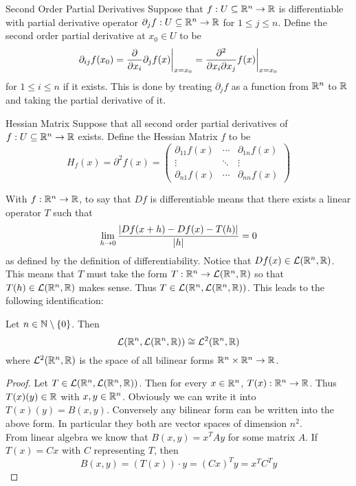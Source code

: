 \documentclass[a4paper]{article}
\begin{document}
\begin{defn}{Second Order Partial Derivatives}{} Suppose that $f:U\subseteq\mathbb{R}^n\to\mathbb{R}$ is differentiable with partial derivative operator $\partial_jf:U\subseteq\mathbb{R}^n\to\mathbb{R}$ for $1\leq j\leq n$. Define the second order partial derivative at $x_0\in U$ to be $$\partial_{ij}f(x_0)=\frac{\partial}{\partial x_i}\partial_jf(x)\bigg{|}_{x=x_0}=\frac{\partial^2}{\partial x_i\partial x_j}f(x)\bigg{|}_{x=x_0}$$
for $1\leq i\leq n$ if it exists. This is done by treating $\partial_jf$ as a function from $\mathbb{R}^n$ to $\mathbb{R}$ and taking the partial derivative of it. 
\end{defn}

\begin{defn}{Hessian Matrix}{} Suppose that all second order partial derivatives of $f:U\subseteq\mathbb{R}^n\to\mathbb{R}$ exists. Define the Hessian Matrix $f$ to be $$H_f(x)=\partial^2 f(x)=\begin{pmatrix}
\partial_{11}f(x) & \cdots & \partial_{1n}f(x)\\
\vdots & \ddots & \vdots\\
\partial_{n1}f(x) & \cdots & \partial_{nn}f(x)
\end{pmatrix}$$
\end{defn}

With $f:\mathbb{R}^n\to\mathbb{R}$, to say that $Df$ is differentiable means that there exists a linear operator $T$ such that $$\lim_{h\to 0}\frac{\abs{Df(x+h)-Df(x)-T(h)}}{\abs{h}}=0$$ as defined by the definition of differentiability. Notice that $Df(x)\in\mathcal{L}(\mathbb{R}^n,\mathbb{R})$. This means that $T$ must take the form $T:\mathbb{R}^n\to\mathcal{L}(\mathbb{R}^n,\mathbb{R})$ so that $T(h)\in\mathcal{L}(\mathbb{R}^n,\mathbb{R})$ makes sense. Thus $T\in\mathcal{L}(\mathbb{R}^n,\mathcal{L}(\mathbb{R}^n,\mathbb{R}))$. This leads to the following identification: 

\begin{prp}{}{} Let $n\in\mathbb{N}\setminus\{0\}$. Then $$\mathcal{L}(\mathbb{R}^n,\mathcal{L}(\mathbb{R}^n,\mathbb{R}))\cong\mathcal{L}^2(\mathbb{R}^n,\mathbb{R})$$ where $\mathcal{L}^2(\mathbb{R}^n,\mathbb{R})$ is the space of all bilinear forms $\mathbb{R}^n\times\mathbb{R}^n\to\mathbb{R}$. 
\begin{proof}
Let $T\in\mathcal{L}(\mathbb{R}^n,\mathcal{L}(\mathbb{R}^n,\mathbb{R}))$. Then for every $x\in\mathbb{R}^n$, $T(x):\mathbb{R}^n\to\mathbb{R}$. Thus $T(x)(y)\in\mathbb{R}$ with $x,y\in\mathbb{R}^n$. Obviously we can write it into $T(x)(y)=B(x,y)$. Conversely any bilinear form can be written into the above form. In particular they both are vector spaces of dimension $n^2$. \\
From linear algebra we know that $B(x,y)=x^TAy$ for some matrix $A$. If $T(x)=Cx$ with $C$ representing $T$, then $$B(x,y)=(T(x))\cdot y=(Cx)^Ty=x^TC^Ty$$
\end{proof}
\end{prp}
\end{document}
